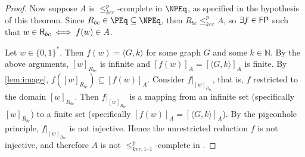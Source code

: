 \documentclass{article}
\theoremstyle{definition} \newtheorem{definition}[definition]{Definition}
\newcommand{\sigmastar}{\{0, 1\}^{*}} %
\newcommand{\kr}{\leq^{p}_{ker}} %
\newcommand{\kri}{\leq^{p}_{ker,1\text{--}1}} %
\newcommand{\pair}[2]{\langle#1,#2\rangle} %
\begin{document}
\begin{proof}
  Now suppose $A$ is $\kr$-complete in $\NPEq$, as specified in the hypothesis
  of this theorem. Since $R_{bc}\in\PEq\subseteq\NPEq$, then $R_{bc}\kr A$, so
  $\exists f\in{\ensuremath{\mathsf{FP}}}$ such that $w\in{\ensuremath{\mathsf{R}}}_{bc}\iff f(w)\in A$.

  Let $w\in\sigmastar$. Then $f(w)=\pair{G}{k}$ for some graph $G$ and some
  $k\in\mathbb{N}$. By the above arguments, $[w]_{R_{bc}}$ is infinite and
  $[f(w)]_A=[\pair{G}{k}]_A$ is finite. By \autoref{lem:image},
  $f([w]_{R_{bc}})\subseteq [f(w)]_A$. Consider $f|_{[w]_{R_{bc}}}$, that is,
  $f$ restricted to the domain $[w]_{R_{bc}}$. Then $f|_{[w]_{R_{bc}}}$ is a
  mapping from an infinite set (specifically $[w]_{R_{bc}}$) to a finite set
  (specifically $[f(w)]_A=[\pair{G}{k}]_A$). By the pigeonhole principle,
  $f|_{[w]_{R_{bc}}}$ is not injective. Hence the unrestricted reduction $f$ is
  not injective, and therefore $A$ is not $\kri$-complete in \NPEq.
\end{proof}

 
\end{document}
